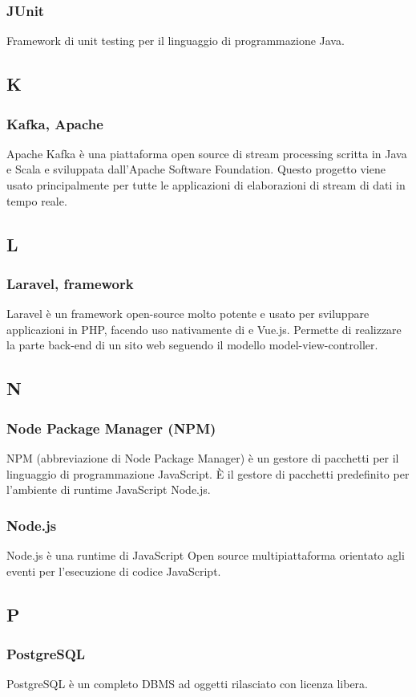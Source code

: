 \subsubsection{JUnit}
Framework di unit testing per il linguaggio di programmazione Java.
\subsection{K}
\subsubsection{Kafka, Apache}  Apache Kafka è una piattaforma open source di stream processing scritta in Java e Scala e sviluppata dall'Apache Software Foundation.  Questo progetto viene usato principalmente per tutte le applicazioni di elaborazioni di stream di dati in tempo reale.
\subsection{L}
\subsubsection{Laravel, framework}  Laravel è un framework open-source molto potente e usato per sviluppare applicazioni in PHP, facendo uso nativamente di  e Vue.js. Permette di realizzare la parte back-end di un sito web seguendo il modello model-view-controller. 
\subsection{N}
\subsubsection{Node Package Manager (NPM)}  NPM (abbreviazione di Node Package Manager) è un gestore di pacchetti per il linguaggio di programmazione JavaScript. È il gestore di pacchetti predefinito per l'ambiente di runtime JavaScript Node.js.
\subsubsection{Node.js}  Node.js è una runtime di JavaScript Open source multipiattaforma orientato agli eventi per l'esecuzione di codice JavaScript.
\subsection{P}
\subsubsection{PostgreSQL}  PostgreSQL è un completo DBMS ad oggetti rilasciato con licenza libera.
